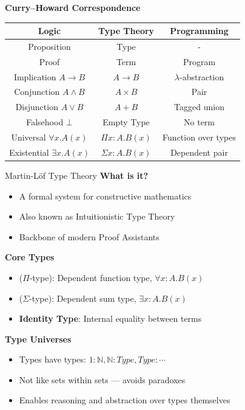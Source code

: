 \documentclass[aspectratio=169, 12pt]{beamer}
\begin{document}
\begin{frame}
\textbf{Curry–Howard Correspondence}
\begin{tabular}{|c|c|c|}
\hline
Logic & Type Theory & Programming \\
\hline
Proposition & Type & - \\
Proof & Term & Program \\
Implication $A \to B$ & $A \to B$ & $\lambda$-abstraction \\
Conjunction $A \land B$ & $A \times B$ & Pair \\
Disjunction $A \lor B$ & $A + B$ & Tagged union \\
Falsehood $\bot$ & Empty Type & No term \\
Universal $\forall x.A(x)$ & $\Pi x:A.B(x)$ & Function over types \\
Existential $\exists x.A(x)$ & $\Sigma x:A.B(x)$ & Dependent pair \\
\hline
\end{tabular}

\end{frame}

    \begin{frame}{Martin-Löf Type Theory}
\textbf{What is it?}
\begin{itemize}
  \item A formal system for constructive mathematics
  \item Also known as Intuitionistic Type Theory
  \item Backbone of modern Proof Assistants
\end{itemize}

\textbf{Core Types}
\begin{itemize}
  \item \textbf{} ($\Pi$-type): Dependent function type, $\forall x:A.B(x)$
  \item \textbf{} ($\Sigma$-type): Dependent sum type, $\exists x:A.B(x)$
  \item \textbf{Identity Type}: Internal equality between terms
\end{itemize}

\end{frame}

\begin{frame}
  \textbf{Type Universes}
\begin{itemize}
  \item Types have types: $1 : \mathbb{N}, \mathbb{N} : Type, Type : \cdots$
  \item Not like sets within sets — avoids paradoxes
  \item Enables reasoning and abstraction over types themselves
  
\end{itemize}  
\end{frame}
\end{document}
